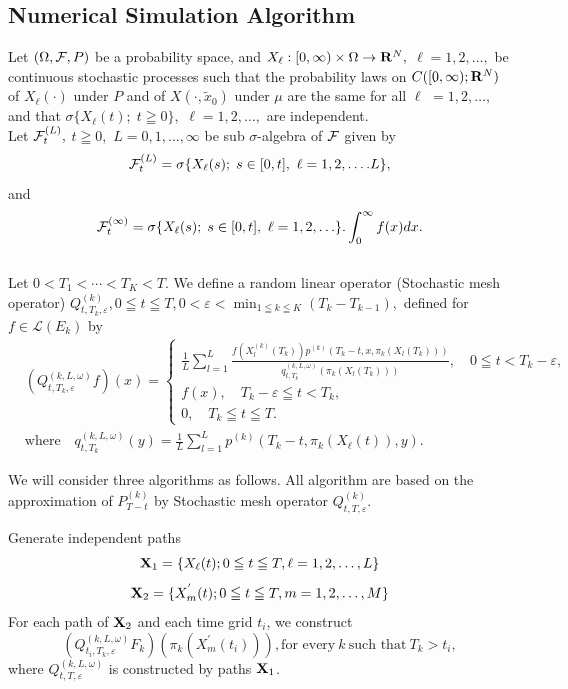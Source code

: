 \documentclass[12pt]{article}
\begin{document}
\subsection{Numerical Simulation Algorithm}
Let $(\Omega ,{\cal F},P)$ be a probability space,
and $X_{\ell }:[0,\infty )\times \Omega \to {\bf R}^N,$ 
$\ell =1,2,\ldots ,$ be continuous stochastic processes such that 
the probability laws on $C([0,\infty );{\bf R}^N)$ of
$X_{\ell}(\cdot )$ under $P$ and of $X(\cdot ,\tilde{x}_0)$ under $\mu$ 
are the same for all $\ell$ $=1,2,\ldots ,$ and that
$\sigma \{ X_{\ell}(t); \; t\geqq 0\},$ $\ell =1,2,\ldots ,$ are independent.\\

Let ${\cal F}_{t}^{(L)},$ $t\geqq 0,$ $L=0,1,\ldots , \infty $ be 
sub $\sigma$-algebra of ${\cal F}$ given by
$$
{\cal F}_{t}^{(L)} 
= \sigma \{ X_{\ell}(s); \; s\in [0,t], \ \ell =1,2,\ldots .L \},
$$
and
$$
{\cal F}_{t}^{(\infty )} 
= \sigma \{ X_{\ell}(s); \; s\in [0,t], \ \ell =1,2,\ldots \} .
\int_0^{\infty}f(x)dx.
$$
\\
Let $0 < T_1 < \cdots < T_K <T.$
We define a random linear operator (Stochastic mesh operator) $Q_{t,T_k,\varepsilon}^{(k)}, 0 \leqq t \leqq T, 0 < \varepsilon <\min_{1\leqq k \leqq K}(T_k-T_{k-1}),$ defined for $f \in \mathcal{L}(E_k)$ by
\begin{align*}
&(Q_{t,T_k,\varepsilon}^{(k,L,\omega)}f)(x)
=
\begin{cases}
\frac{1}{L} \sum_{l=1}^L \frac{f(X_l^{(k)}(T_k))p^{(k)}(T_k-t, x, \pi_k( X_l(T_k)))}{q_{t,T_k}^{(k,L,\omega)}(\pi_k (X_l(T_k)))}, 
\quad 0 \leqq t <T_k-\varepsilon ,\\
f(x), \quad T_k - \varepsilon \leqq t < T_k, \\
0, \quad T_k \leqq t \leqq T .
\end{cases}\\
&\text{where} \quad q_{t,T_k}^{(k,L,\omega)}(y)=\frac{1}{L}\sum_{l=1}^L p^{(k)}(T_k-t, \pi_k(X_{\ell}(t)), y).
\end{align*}

We will consider three algorithms as follows. All algorithm are based on the 
approximation of $P^{(k)}_{T-t}$ by Stochastic mesh operator $Q_{t,T,\varepsilon}^{(k)}$.\\


\noindent \qquad[Step1] Generate independent paths 
$${\bf X}_1 = \{X_{\ell }(t); 0 \leqq t \leqq T, \ell =1,2,\ldots ,L\}$$
$${\bf X}_2=\{X^{'}_{m }(t); 0 \leqq t \leqq T,  m =1,2,\ldots ,M\}$$
\qquad[Step2]  For each path of ${\bf X}_2$ and each time grid $t_i$, we construct
$$(Q_{t_i,T_k,\varepsilon}^{(k,L,\omega)}F_k)(\pi_k(X^{'}_m(t_i))), \text{for every}\  k \  \text{such that} \ T_k > t_i ,$$
\qquad \qquad where $Q_{t,T,\varepsilon}^{(k,L,\omega)}$ is constructed by paths ${\bf X}_1$.
\end{document}
